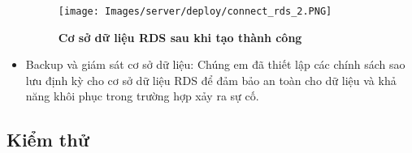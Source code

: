 \begin{itemize}
  \begin{figure}[H]
    \centering
    \texttt{[image: Images/server/deploy/connect\_rds\_2.PNG]}
    \caption[Cơ sở dữ liệu RDS sau khi tạo thành công]{\bfseries \fontsize{12pt}{0pt}
    \selectfont Cơ sở dữ liệu RDS sau khi tạo thành công}
    \label{rds_detail} %
  \end{figure}


  \item Backup và giám sát cơ sở dữ liệu: Chúng em đã thiết lập các chính sách sao lưu định kỳ cho cơ sở dữ liệu RDS để đảm bảo an toàn cho dữ liệu và khả năng khôi phục trong trường hợp xảy ra sự cố.
\end{itemize}

\subsection{Kiểm thử}










  


